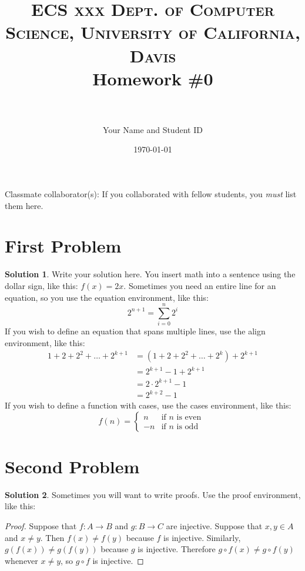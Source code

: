 \documentclass[paper=a4, fontsize=11pt]{scrartcl} %
\title{
\normalfont \normalsize
\textsc{ECS xxx \hfill Dept. of Computer Science, University of California, Davis} %
\horrule{0.5pt} \\[0.4cm] %
\huge Homework \#0 \\ %
\horrule{2pt} \\[0.5cm] %
}
\author{Your Name and Student ID} %
\date{\today}
\numberwithin{equation}{section} %
\numberwithin{figure}{section} %
\numberwithin{table}{section} %
\theoremstyle{definition}
\newtheorem*{solution}{Solution}
\begin{document}
\maketitle

Classmate collaborator(s): If you collaborated with fellow students, you \emph{must} list them here.

\section{First Problem}
    \begin{solution}
        Write your solution here.
        You insert math into a sentence using the dollar sign, like this: $f(x) = 2x$.
        Sometimes you need an entire line for an equation, so you use the equation environment, like this:
        \begin{equation*}
            2^{n+1} = \sum_{i=0}^{n} 2^{i}
        \end{equation*}
        If you wish to define an equation that spans multiple lines, use the align environment, like this:
        \begin{align*}
            1 + 2 + 2^2 + \ldots + 2^{k+1} &= (1 + 2 + 2^2 + \ldots + 2^k) + 2^{k+1}\\
                &= 2^{k+1} - 1 + 2^{k+1}\\
                &= 2 \cdot 2^{k+1} - 1\\
                &= 2^{k + 2} - 1
        \end{align*}
        If you wish to define a function with cases, use the cases environment, like this:
        \begin{equation*}
            f(n) =
                \begin{cases}
                    n   &   \text{if $n$ is even } \\
                    -n  &   \text{if $n$ is odd}
                \end{cases}
        \end{equation*}
    \end{solution}

\section{Second Problem}
    \begin{solution}
    Sometimes you will want to write proofs. Use the proof environment, like this:
    \begin{proof}
        Suppose that $f:A \to B$ and $g:B \to C$ are injective. Suppose that $x, y \in A$ and $x \neq y$. Then $f(x) \neq f(y)$ because $f$ is injective. Similarly, $g(f(x)) \neq g(f(y))$ because $g$ is injective. Therefore $g \circ f (x) \neq g \circ f (y)$ whenever $x \neq y$, so $g \circ f$ is injective.
    \end{proof}
    \end{solution}
\end{document}
